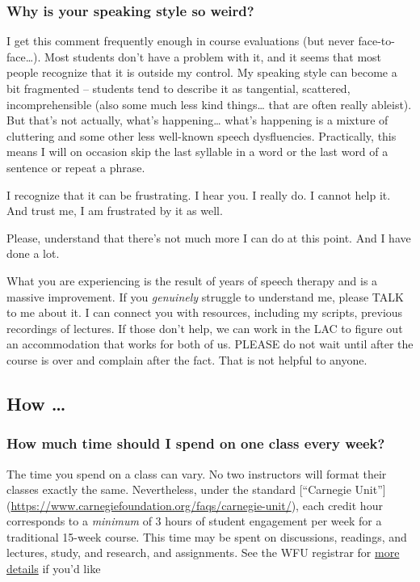 \hypertarget{why-is-your-speaking-style-so-weird}{%
\subsubsection{Why is your speaking style so weird?}\label{why-is-your-speaking-style-so-weird}}

I get this comment frequently enough in course evaluations (but never face-to-face\ldots). Most students don't have a problem with it, and it seems that most people recognize that it is outside my control. My speaking style can become a bit fragmented -- students tend to describe it as tangential, scattered, incomprehensible (also some much less kind things\ldots{} that are often really ableist). But that's not actually, what's happening\ldots{} what's happening is a mixture of cluttering and some other less well-known speech dysfluencies. Practically, this means I will on occasion skip the last syllable in a word or the last word of a sentence or repeat a phrase.

I recognize that it can be frustrating. I hear you. I really do. I cannot help it. And trust me, I am frustrated by it as well.

Please, understand that there's not much more I can do at this point. And I have done a lot.

What you are experiencing is the result of years of speech therapy and is a massive improvement. If you \emph{genuinely} struggle to understand me, please TALK to me about it. I can connect you with resources, including my scripts, previous recordings of lectures. If those don't help, we can work in the LAC to figure out an accommodation that works for both of us. PLEASE do not wait until after the course is over and complain after the fact. That is not helpful to anyone.

\hypertarget{how}{%
\subsection{How \ldots{}}\label{how}}

\hypertarget{how-much-time-should-i-spend-on-one-class-every-week}{%
\subsubsection{How much time should I spend on one class every week?}\label{how-much-time-should-i-spend-on-one-class-every-week}}

The time you spend on a class can vary. No two instructors will format their classes exactly the same. Nevertheless, under the standard {[}``Carnegie Unit''{]} (\url{https://www.carnegiefoundation.org/faqs/carnegie-unit/}), each credit hour corresponds to a \emph{minimum} of 3 hours of student engagement per week for a traditional 15-week course. This time may be spent on discussions, readings, and lectures, study, and research, and assignments. See the WFU registrar for \href{https://registrar.wfu.edu/semester-credit-hour/}{more details} if you'd like

